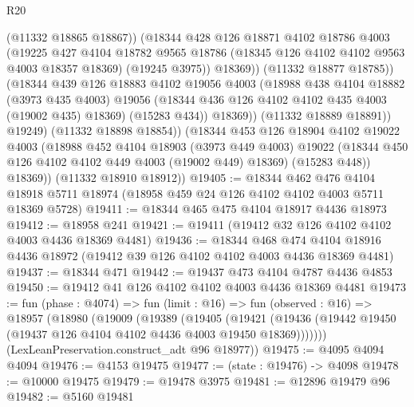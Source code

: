 \begin{lexlean}{R20}
\begin{coremodule}
                      (@11332 @18865 @18867))
                    (@18344
                      @428
                      @126
                      @18871
                      @4102
                      @18786
                      @4003
                      (@19225
                        @427
                        @4104
                        @18782
                        @9565
                        @18786
                        (@18345 @126 @4102 @4102 @9563 @4003 @18357 @18369)
                        (@19245 @3975))
                      @18369))
                  (@11332 @18877 @18785))
                (@18344
                  @439
                  @126
                  @18883
                  @4102
                  @19056
                  @4003
                  (@18988
                    @438
                    @4104
                    @18882
                    (@3973 @435 @4003)
                    @19056
                    (@18344 @436 @126 @4102 @4102 @435 @4003 (@19002 @435) @18369)
                    (@15283 @434))
                  @18369))
              (@11332 @18889 @18891))
            @19249)
          (@11332 @18898 @18854))
        (@18344
          @453
          @126
          @18904
          @4102
          @19022
          @4003
          (@18988
            @452
            @4104
            @18903
            (@3973 @449 @4003)
            @19022
            (@18344 @450 @126 @4102 @4102 @449 @4003 (@19002 @449) @18369)
            (@15283 @448))
          @18369))
      (@11332 @18910 @18912))
@19405 := @18344
    @462
    @476
    @4104
    @18918
    @5711
    @18974
    (@18958 @459 @24 @126 @4102 @4102 @4003 @5711 @18369 @5728)
@19411 := @18344 @465 @475 @4104 @18917 @4436 @18973
@19412 := @18958 @241
@19421 := @19411 (@19412 @32 @126 @4102 @4102 @4003 @4436 @18369 @4481)
@19436 := @18344
    @468
    @474
    @4104
    @18916
    @4436
    @18972
    (@19412 @39 @126 @4102 @4102 @4003 @4436 @18369 @4481)
@19437 := @18344 @471
@19442 := @19437 @473 @4104 @4787 @4436 @4853
@19450 := @19412 @41 @126 @4102 @4102 @4003 @4436 @18369 @4481
@19473 := fun (phase : @4074) =>
  fun (limit : @16) =>
  fun (observed : @16) =>
  @18957
    (@18980
      (@19009
        (@19389
          (@19405
            (@19421 (@19436 (@19442 @19450 (@19437 @126 @4104 @4102 @4436 @4003 @19450 @18369)))))))
      (LexLeanPreservation.construct_adt @96 @18977))
@19475 := @4095 @4094 @4094
@19476 := @4153 @19475
@19477 := (state : @19476) -> @4098
@19478 := @10000 @19475
@19479 := @19478 @3975
@19481 := @12896 @19479 @96
@19482 := @5160 @19481

\end{coremodule}
\end{lexlean}
